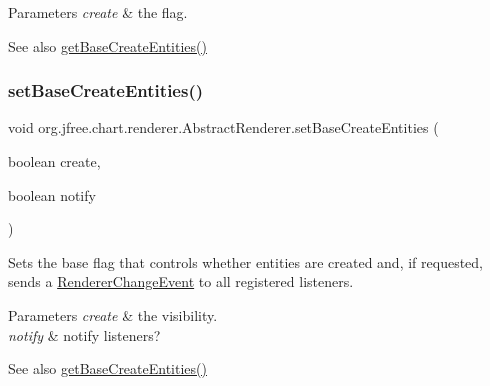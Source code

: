 \begin{DoxyParams}{Parameters}
{\em create} & the flag.\\
\hline
\end{DoxyParams}
\begin{DoxySeeAlso}{See also}
\mbox{\hyperlink{classorg_1_1jfree_1_1chart_1_1renderer_1_1_abstract_renderer_a44d0d70c2ce52e48ba1ccafade04693b}{get\+Base\+Create\+Entities()}} 
\end{DoxySeeAlso}
\mbox{\label{classorg_1_1jfree_1_1chart_1_1renderer_1_1_abstract_renderer_a3ecec5aa80585e782546851e2abf7e67}} 
\subsubsection{\texorpdfstring{set\+Base\+Create\+Entities()}{setBaseCreateEntities()}\hspace{0.1cm}{\footnotesize\ttfamily [2/2]}}
{\footnotesize\ttfamily void org.\+jfree.\+chart.\+renderer.\+Abstract\+Renderer.\+set\+Base\+Create\+Entities (\begin{DoxyParamCaption}\item[{boolean}]{create,  }\item[{boolean}]{notify }\end{DoxyParamCaption})}

Sets the base flag that controls whether entities are created and, if requested, sends a \mbox{\hyperlink{}{Renderer\+Change\+Event}} to all registered listeners.


\begin{DoxyParams}{Parameters}
{\em create} & the visibility. \\
\hline
{\em notify} & notify listeners?\\
\hline
\end{DoxyParams}
\begin{DoxySeeAlso}{See also}
\mbox{\hyperlink{classorg_1_1jfree_1_1chart_1_1renderer_1_1_abstract_renderer_a44d0d70c2ce52e48ba1ccafade04693b}{get\+Base\+Create\+Entities()}} 
\end{DoxySeeAlso}
\mbox{\label{classorg_1_1jfree_1_1chart_1_1renderer_1_1_abstract_renderer_adc85155c19775ca3f04043f15e060811}} 
